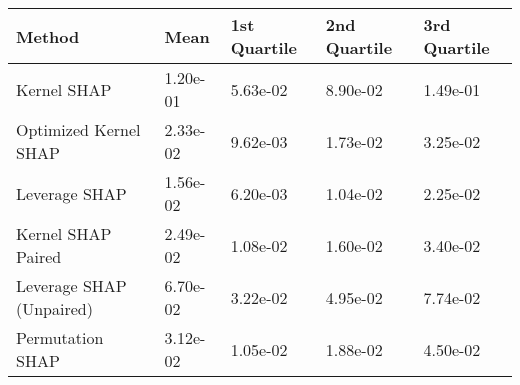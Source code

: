 \begin{tabular}{lllll}
  \toprule
  \textbf{Method} & \textbf{Mean} & \textbf{1st Quartile} & \textbf{2nd Quartile} & \textbf{3rd Quartile} \\ \midrule 
Kernel SHAP & 1.20e-01 & 5.63e-02 & 8.90e-02 & 1.49e-01\\
Optimized Kernel SHAP & \cellcolor{silver!60}2.33e-02 & \cellcolor{silver!60}9.62e-03 & \cellcolor{bronze!60}1.73e-02 & \cellcolor{silver!60}3.25e-02\\
Leverage SHAP & \cellcolor{gold!60}1.56e-02 & \cellcolor{gold!60}6.20e-03 & \cellcolor{gold!60}1.04e-02 & \cellcolor{gold!60}2.25e-02\\
Kernel SHAP Paired & \cellcolor{bronze!60}2.49e-02 & 1.08e-02 & \cellcolor{silver!60}1.60e-02 & \cellcolor{bronze!60}3.40e-02\\
Leverage SHAP (Unpaired) & 6.70e-02 & 3.22e-02 & 4.95e-02 & 7.74e-02\\
Permutation SHAP & 3.12e-02 & \cellcolor{bronze!60}1.05e-02 & 1.88e-02 & 4.50e-02\\
\bottomrule
\end{tabular}